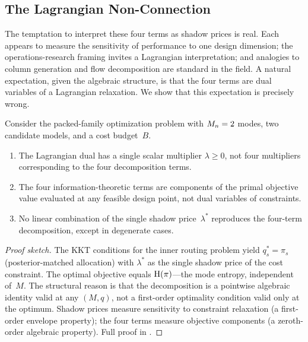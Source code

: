 \subsection{The Lagrangian Non-Connection}
\label{sec:lagrangian}

The temptation to interpret these four terms as shadow prices is real.
Each appears to measure the sensitivity of performance to one design dimension; the operations-research framing invites a Lagrangian interpretation; and analogies to column generation and flow decomposition are standard in the field.
A natural expectation, given the algebraic structure, is that the four terms are dual variables of a Lagrangian relaxation.
We show that this expectation is precisely wrong.

\begin{proposition}
\label{prop:lagrangian}
Consider the packed-family optimization problem with $M_n = 2$ modes, two candidate models, and a cost budget~$B$.
\begin{enumerate}[label=(\alph*)]
  \item The Lagrangian dual has a single scalar multiplier $\lambda \ge 0$, not four multipliers corresponding to the four decomposition terms.
  \item The four information-theoretic terms are components of the primal objective value evaluated at any feasible design point, not dual variables of constraints.
  \item No linear combination of the single shadow price~$\lambda^*$ reproduces the four-term decomposition, except in degenerate cases.
\end{enumerate}
\end{proposition}

\begin{proof}[Proof sketch]
The KKT conditions for the inner routing problem yield $q_s^* = \pi_s$ (posterior-matched allocation) with $\lambda^*$ as the single shadow price of the cost constraint.
The optimal objective equals $\mathrm{H}(\pi)$---the mode entropy, independent of~$M$.
The structural reason is that the decomposition is a pointwise algebraic identity valid at any $(M, q)$, not a first-order optimality condition valid only at the optimum.
Shadow prices measure sensitivity to constraint relaxation (a first-order envelope property); the four terms measure objective components (a zeroth-order algebraic property).
Full proof in .
\end{proof}

